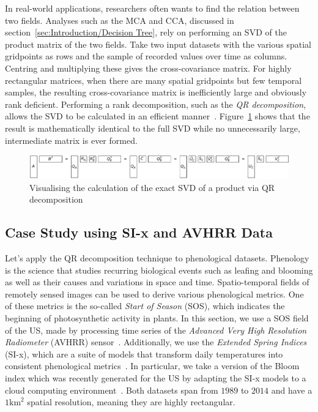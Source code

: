 \documentclass[ijgi,article,submit,moreauthors,pdftex,10pt,a4paper]{Definitions/mdpi}
\begin{document}
In real-world applications, researchers often wants to find the relation between two fields. Analyses such as the MCA and CCA, discussed in section~\ref{sec:Introduction/Decision Tree}, rely on performing an SVD of the product matrix of the two fields. Take two input datasets with the various spatial gridpoints as rows and the sample of recorded values over time as columns. Centring and multiplying these gives the cross-covariance matrix. For highly rectangular matrices, when there are many spatial gridpoints but few temporal samples, the resulting cross-covariance matrix is inefficiently large and obviously rank deficient. Performing a rank decomposition, such as the \textit{QR decomposition}, allows the SVD to be calculated in an efficient manner~\cite{Chan1982, Tygert2017}. Figure~\ref{fig:qrProductSVD} shows that the result is mathematically identical to the full SVD while no unnecessarily large, intermediate matrix is ever formed.

\begin{figure}[H]
\centering
\includegraphics[width=\textwidth]{Results/qrProductSVD.pdf}
\caption[Exact SVD via QR decomposition]{Visualising the calculation of the exact SVD of a product via QR decomposition}
\label{fig:qrProductSVD}
\end{figure}

\subsection{Case Study using SI-x and AVHRR Data}
\label{sec:Results/Case Study using SI-x and AVHRR Data}

Let's apply the QR decomposition technique to phenological datasets. Phenology is the science that studies recurring biological events such as leafing and blooming as well as their causes and variations in space and time. Spatio-temporal fields of remotely sensed images can be used to derive various phenological metrics. One of these metrics is the so-called \textit{Start of Season} (SOS), which indicates the beginning of photosynthetic activity in plants. In this section, we use a SOS field of the US, made by processing time series of the \textit{Advanced Very High Resolution Radiometer} (AVHRR) sensor~\cite{Reed1994}. Additionally, we use the \textit{Extended Spring Indices} (SI-x), which are a suite of models that transform daily temperatures into consistent phenological metrics~\cite{Schwartz2013}. In particular, we take a version of the Bloom index which was recently generated for the US by adapting the SI-x models to a cloud computing environment~\cite{Izquierdo2015}. Both datasets span from $1989$ to $2014$ and have a $1\text{km}^2$ spatial resolution, meaning they are highly rectangular.
\end{document}
